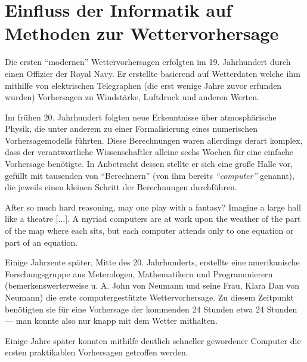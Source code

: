 \documentclass{article}
\begin{document}
\section*{Einfluss der Informatik auf Methoden zur Wettervorhersage}

Die ersten \enquote{modernen} Wettervorhersagen erfolgten im 19. Jahrhundert durch einen Offizier der Royal Navy. Er erstellte basierend auf Wetterdaten welche ihm mithilfe von elektrischen Telegraphen (die erst wenige Jahre zuvor erfunden wurden) Vorhersagen zu Windstärke, Luftdruck und anderen Werten.

Im frühen 20. Jahrhundert folgten neue Erkenntnisse über atmosphärische Physik, die unter anderem zu einer Formalisierung eines numerischen Vorhersagemodells führten. Diese Berechnungen waren allerdings derart komplex, dass der verantwortliche Wissenschaftler alleine sechs Wochen für eine einfache Vorhersage benötigte. In Anbetracht dessen stellte er sich eine große Halle vor, gefüllt mit tausenden von \enquote{Berechnern} (von ihm bereits \emph{\enquote{computer}} genannt), die jeweils einen kleinen Schritt der Berechnungen durchführen.

\begin{displayquote}
    After so much hard reasoning, may one play with a fantasy? Imagine a large hall like a theatre [...]. A myriad computers are at work upon the weather of the part of the map where each sits, but each computer attends only to one equation or part of an equation.
\end{displayquote}

Einige Jahrzente später, Mitte des 20. Jahrhunderts, erstellte eine amerikanische Forschungsgruppe aus Meterologen, Mathematikern und Programmierern (bemerkenswerterweise u. A. John von Neumann und seine Frau, Klara Dan von Neumann) die erste computergestützte Wettervorhersage. Zu diesem Zeitpunkt benötigten sie für eine Vorhersage der kommenden 24 Stunden etwa 24 Stunden --- man konnte also nur knapp mit dem Wetter mithalten.

Einige Jahre später konnten mithilfe deutlich schneller gewordener Computer die ersten praktikablen Vorhersagen getroffen werden.
\end{document}
